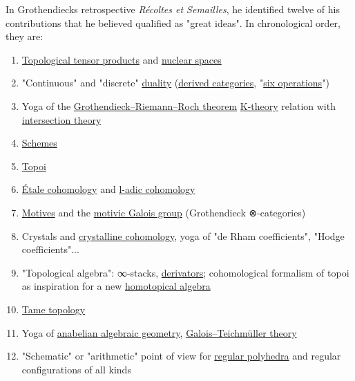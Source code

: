 In Grothendieck\textquotesingle s retrospective \emph{Récoltes et Semailles}, he identified twelve of his contributions that he believed qualified as "great ideas". In chronological order, they are:

\begin{enumerate}
\tightlist
\item
  {\href{https://en.wikipedia.org/wiki/Topological_tensor_product}{Topological tensor products} and \href{https://en.wikipedia.org/wiki/Nuclear_space}{nuclear spaces}}
\item
  {"Continuous" and "discrete" \href{https://en.wikipedia.org/wiki/Duality_(mathematics)}{duality} (\href{https://en.wikipedia.org/wiki/Derived_category}{derived categories}, "\href{https://en.wikipedia.org/wiki/Six_operations_(mathematics)}{six operations}")}
\item
  {Yoga of the \href{https://en.wikipedia.org/wiki/Grothendieck–Riemann–Roch_theorem}{Grothendieck--Riemann--Roch theorem} \href{https://en.wikipedia.org/wiki/K-theory}{K-theory} relation with \href{https://en.wikipedia.org/wiki/Intersection_theory}{intersection theory}}
\item
  {\href{https://en.wikipedia.org/wiki/Scheme_(mathematics)}{Schemes}}
\item
  {\href{https://en.wikipedia.org/wiki/Topos}{Topoi}}
\item
  {\href{https://en.wikipedia.org/wiki/Étale_cohomology}{Étale cohomology} and \href{https://en.wikipedia.org/wiki/L-adic_cohomology}{l-adic cohomology}}
\item
  {\href{https://en.wikipedia.org/wiki/Motive_(algebraic_geometry)}{Motives} and the \href{https://en.wikipedia.org/wiki/Motivic_Galois_group}{motivic Galois group} (Grothendieck ⊗-categories)}
\item
  {Crystals and \href{https://en.wikipedia.org/wiki/Crystalline_cohomology}{crystalline cohomology}, yoga of "de Rham coefficients", "Hodge coefficients"...}
\item
  {"Topological algebra": ∞-stacks, \href{https://en.wikipedia.org/wiki/Derivator}{derivators}; cohomological formalism of topoi as inspiration for a new \href{https://en.wikipedia.org/wiki/Homotopical_algebra}{homotopical algebra}}
\item
  {\href{https://en.wikipedia.org/wiki/Tame_topology}{Tame topology}}
\item
  {Yoga of \href{https://en.wikipedia.org/wiki/Anabelian_geometry}{anabelian algebraic geometry}, \href{https://en.wikipedia.org/wiki/Galois–Teichmüller_theory}{Galois--Teichmüller theory}}
\item
  {"Schematic" or "arithmetic" point of view for \href{https://en.wikipedia.org/wiki/Regular_polyhedron}{regular polyhedra} and regular configurations of all kinds}
\end{enumerate}

